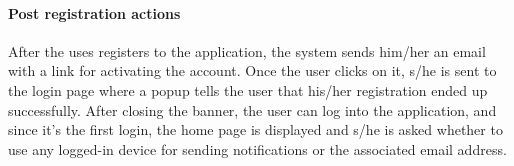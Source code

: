 \paragraph{Post registration actions} After the uses registers to the application, the system sends him/her an email with a link for activating the account. Once the user clicks on it, s/he is sent to the login page where a popup tells the user that his/her registration ended up successfully. After closing the banner, the user can log into the application, and since it's the first login, the home page is displayed and s/he is asked whether to use any logged-in device for sending notifications or the associated email address.

\begin{figure}[h!]
    \begin{minipage}{0.49\textwidth}
        \centering

\end{minipage}
\end{figure}
